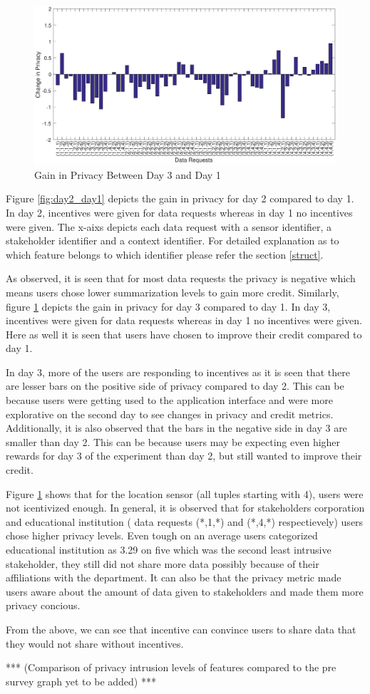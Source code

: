 \begin{figure}[ht!]
\centering
\includegraphics[width=\textwidth,keepaspectratio]{./images/day3_day1_privacy}
\caption{Gain in Privacy Between Day 3 and Day 1}
\label{fig:day3_day1}
\end{figure}

Figure \ref{fig:day2_day1} depicts the gain in privacy for day 2 compared to day 1. In day 2, incentives were given for data requests whereas in day 1 no incentives were given. The x-aixs depicts each data request with a sensor identifier, a stakeholder identifier and a context identifier. For detailed explanation as to which feature belongs to which identifier please refer the section \ref{struct}. 

As observed, it is seen that for most data requests the privacy is negative which means users chose lower summarization levels to gain more credit. Similarly, figure \ref{fig:day3_day1} depicts the gain in privacy for day 3 compared to day 1. In day 3, incentives were given for data requests whereas in day 1 no incentives were given. Here as well it is seen that users have chosen to improve their credit compared to day 1. 

In day 3, more of the users are responding to incentives as it is seen that there are lesser bars on the positive side of privacy compared to day 2. This can be because users were getting used to the application interface and were more explorative on the second day to see changes in privacy and credit metrics. Additionally, it is also observed that the bars in the negative side in day 3 are smaller than day 2. This can be because users may be expecting even higher rewards for day 3 of the experiment than day 2, but still wanted to improve their credit.




Figure \ref{fig:day3_day1} shows that for the location sensor (all tuples starting with 4), users were not icentivized enough. In general, it is observed that for stakeholders corporation and educational institution ( data requests (*,1,*) and (*,4,*) respectievely) users chose higher privacy levels. Even tough on an average users categorized educational institution as 3.29 on five which was the second least intrusive stakeholder, they still did not share more data possibly because of their affiliations with the department. It can also be that the privacy metric made users aware about the amount of data given to stakeholders and made them more privacy concious.

From the above, we can see that incentive can convince users to share data that they would not share without incentives.

*** (Comparison of privacy intrusion levels of features compared to the pre survey graph yet to be added) ***



